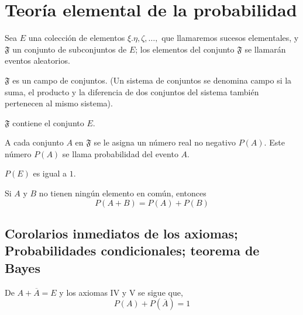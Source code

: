 \chapter{Teoría elemental de la probabilidad}

\begin{tcolorbox}[colframe=white]
Sea $E$ una colección de elementos $\xi.\eta,\zeta,\ldots,$ que llamaremos sucesos elementales, y $\mathfrak{F}$ un conjunto de subconjuntos de $E$; los elementos del conjunto $\mathfrak{F}$ se llamarán eventos aleatorios.

    \begin{axioma}
	$\mathfrak{F}$ es un campo de conjuntos. (Un sistema de conjuntos se denomina campo si la suma, el producto y la diferencia de dos conjuntos del sistema también pertenecen al mismo sistema).

    \end{axioma}

    \begin{axioma}
	$\mathfrak{F}$ contiene el conjunto $E$.
    \end{axioma}

    \begin{axioma}
	A cada conjunto $A$ en $\mathfrak{F}$ se le asigna un número real no negativo $P(A)$. Este número $P(A)$ se llama probabilidad del evento $A$.
    \end{axioma}

    \begin{axioma}
	$P(E)$ es igual a $1$.
    \end{axioma}

    \begin{axioma}
	Si $A$ y $B$ no tienen ningún elemento en común, entonces $$P(A+B)=P(A)+P(B)$$
    \end{axioma}

\end{tcolorbox}

\setcounter{section}{3}
\section{Corolarios inmediatos de los axiomas; Probabilidades condicionales; teorema de Bayes}
De $A+\overline{A}=E$ y los axiomas IV y V se sigue que, 
\begin{equation}
    P(A)+P(\overline{A})=1
\end{equation}

